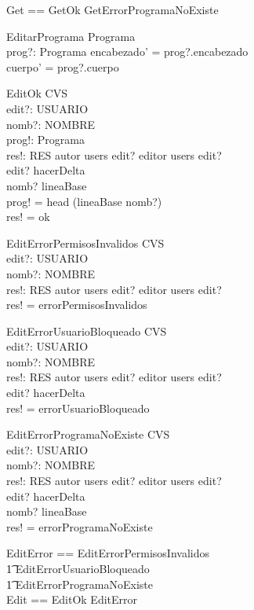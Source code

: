 \documentclass[a4paper, 12pt] {article}
\begin{document}
\begin{zed}
Get == GetOk \lor GetErrorProgramaNoExiste
\end{zed}

\begin{schema}{EditarPrograma}
\Delta Programa \\
prog?: Programa
\where
encabezado' = prog?.encabezado \\
cuerpo' = prog?.cuerpo
\end{schema}

\begin{schema}{EditOk}
\Delta CVS \\
edit?: USUARIO \\
nomb?: NOMBRE \\
prog!: Programa \\
res!: RES
\where
autor \in users \: edit? \lor editor \in users \: edit? \\
edit? \notin hacerDelta \\
nomb? \in \dom lineaBase \\
prog! = head (lineaBase \: nomb?) \\
res! = ok
\end{schema}

\begin{schema}{EditErrorPermisosInvalidos}
\Xi CVS \\
edit?: USUARIO \\
nomb?: NOMBRE \\
res!: RES
\where
autor \notin users \: edit? \lor editor \notin users \: edit? \\
res! = errorPermisosInvalidos
\end{schema}

\begin{schema}{EditErrorUsuarioBloqueado}
\Xi CVS \\
edit?: USUARIO \\
nomb?: NOMBRE \\
res!: RES
\where
autor \in users \: edit? \lor editor \in users \: edit? \\
edit? \in hacerDelta \\
res! = errorUsuarioBloqueado
\end{schema}

\begin{schema}{EditErrorProgramaNoExiste}
\Xi CVS \\
edit?: USUARIO \\
nomb?: NOMBRE \\
res!: RES
\where
autor \in users \: edit? \lor editor \in users \: edit? \\
edit? \notin hacerDelta \\
nomb? \notin \dom lineaBase \\
res! = errorProgramaNoExiste
\end{schema}

\begin{zed}
EditError == EditErrorPermisosInvalidos \\
\t1 \lor EditErrorUsuarioBloqueado \\
\t1 \lor EditErrorProgramaNoExiste \\
Edit == EditOk \lor EditError
\end{zed}
\end{document}
